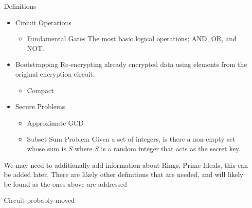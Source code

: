 \documentclass[a0,portrait]{a0poster}
\begin{document}
\begin{multicols}{2}
\begin{slide}{Definitions}
\begin{itemize}
\item Circuit Operations
\begin{itemize}
\item Fundamental Gates
  The most basic logical operations; AND, OR, and NOT. 
\end{itemize}
\item Bootstrapping
  Re-encrypting already encrypted data using elements from the original encryption circuit.
\begin{itemize}
\item Compact
\end{itemize}
\item Secure Problems
\begin{itemize}
\item Approximate GCD
\item Subset Sum Problem
  Given a set of integers, is there a non-empty set whose sum is $S$ where $S$ is a random integer that acts as the secret key.
\end{itemize}

\end{itemize}


We may need to additionally add information about Rings, Prime Ideals, this can be added later. There are likely other definitions that are needed, and will likely be found as the ones above are addressed
\end{slide}


\begin{slide}{Circuit probably moved}

\begin{multicols}{3}



\end{multicols}
\end{slide}
\end{multicols}
\end{document}
